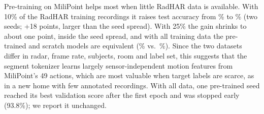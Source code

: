 Pre-training on MiliPoint helps most when little RadHAR data is available. With
10\% of the RadHAR training recordings it raises test accuracy from
\trrhxyzscratchfTen\% to \trrhxyzmpinitfTen\% (two seeds; +18 points, larger
than the seed spread). With 25\% the gain shrinks to about one point, inside the
seed spread, and with all training data the pre-trained and scratch models are
equivalent (\trrhxyzmpinitfFull\% vs.\ \trrhablxyz\%). Since the two datasets
differ in radar, frame rate, subjects, room and label set, this suggests that
the segment tokenizer learns largely sensor-independent motion features from MiliPoint's
49 actions, which are most valuable when target labels are scarce, as in a new
home with few annotated recordings. With all data, one pre-trained seed reached its best validation score after the
first epoch and was stopped early (93.8\%); we report it unchanged.
